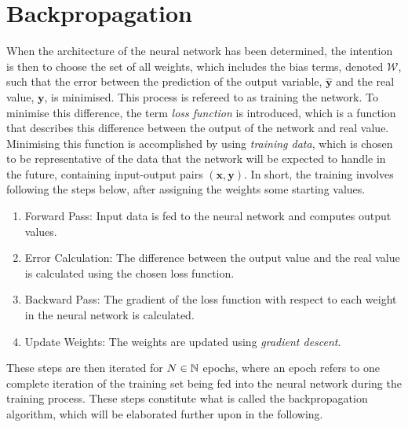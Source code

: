 \section{Backpropagation}
When the architecture of the neural network has been determined, the intention is then to choose the set of all weights, which includes the bias terms, denoted $\mathcal{W}$, such that the error between the prediction of the output variable, $\hat{\bm{y}}$ and the real value, $\bm{y}$, is minimised. This process is refereed to as training the network. To minimise this difference, the term \emph{loss function} is introduced, which is a function that describes this difference between the output of the network and real value. Minimising this function is accomplished by using \emph{training data}, which is chosen to be representative of the data that the network will be expected to handle in the future, containing input-output pairs $(\bm{x},\bm{y})$. In short, the training involves following the steps below, after assigning the weights some starting values.
\begin{enumerate}
    \item Forward Pass: Input data is fed to the neural network and computes output values. 
    \item Error Calculation: The difference between the output value and the real value is calculated using the chosen loss function.
    \item Backward Pass: The gradient of the loss function with respect to each weight in the neural network is calculated.
    \item Update Weights: The weights are updated using \emph{gradient descent}.
\end{enumerate}
These steps are then iterated for $N\in\mathbb{N}$ epochs, where an epoch refers to one complete iteration of the training set being fed into the neural network during the training process. These steps constitute what is called the backpropagation algorithm, which will be elaborated further upon in the following. 

